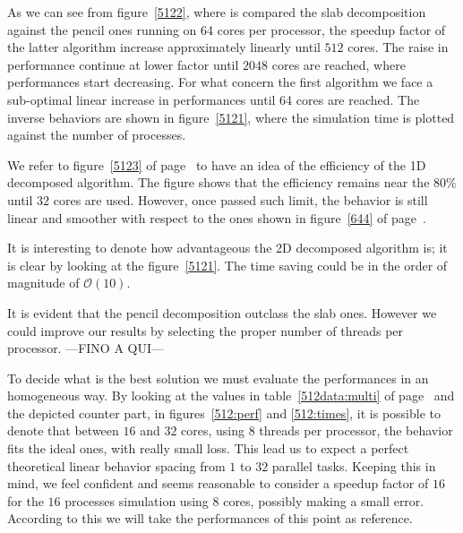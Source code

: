 As we can see from figure~\ref{5122}, where is compared the slab decomposition against the pencil ones running on 64 cores per processor, the speedup factor of the latter algorithm increase approximately linearly until $512$ cores. The raise in performance continue at lower factor until $2048$ cores are reached, where performances start decreasing. For what concern the first algorithm we face a sub-optimal linear increase in performances until 64 cores are reached. 
The inverse behaviors are shown in figure~\ref{5121}, where the simulation time is plotted against the number of processes.
\par
We refer to figure~\ref{5123} of page~\pageref{5123} to have an idea of the efficiency of the 1D decomposed algorithm. The figure shows that the efficiency remains near the $80\%$ until $32$ cores are used. However, once passed such limit, the behavior is still linear and smoother with respect to the ones shown in figure~\ref{644} of page~\pageref{644}.  \\
\par
It is interesting to denote how advantageous the 2D decomposed algorithm is; it is clear by looking at the figure~\ref{5121}. The time saving could be in the order of magnitude of $\mathcal{O}(10)$.\\
\par
It is evident that the pencil decomposition outclass the slab ones. However we could improve our results by selecting the proper number of threads per processor. 
---FINO A QUI---
\par
To decide what is the best solution we must evaluate the performances in an homogeneous way.
By looking at the values in table~\ref{512data:multi} of page~\pageref{512data:multi} and the depicted counter part, in figures~\ref{512:perf} and \ref{512:times}, it is possible to denote that between $16$ and $32$ cores, using 8 threads per processor, the behavior fits the ideal ones,  with really  small loss. This lead us to expect a perfect theoretical linear behavior spacing from $1$ to $32$ parallel tasks. Keeping this in mind, we feel confident and seems reasonable to consider a speedup factor of $16$ for the $16$ processes simulation using 8 cores, possibly making a small error. According to this we will take the performances of this point as reference.\\
\par


